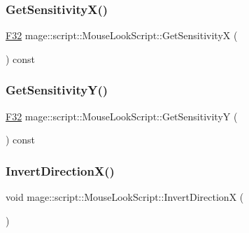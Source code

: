 \hypertarget{classmage_1_1script_1_1_mouse_look_script_a86ee9593f0221bfa259f5ae5dd6edb30}{}\label{classmage_1_1script_1_1_mouse_look_script_a86ee9593f0221bfa259f5ae5dd6edb30} 
\subsubsection{\texorpdfstring{Get\+Sensitivity\+X()}{GetSensitivityX()}}
{\footnotesize\ttfamily \hyperlink{namespacemage_aa97e833b45f06d60a0a9c4fc22ae02c0}{F32} mage\+::script\+::\+Mouse\+Look\+Script\+::\+Get\+SensitivityX (\begin{DoxyParamCaption}{ }\end{DoxyParamCaption}) const\hspace{0.3cm}{\ttfamily [noexcept]}}

\hypertarget{classmage_1_1script_1_1_mouse_look_script_a39303e2d535ecc610ac4ea2f23825452}{}\label{classmage_1_1script_1_1_mouse_look_script_a39303e2d535ecc610ac4ea2f23825452} 
\subsubsection{\texorpdfstring{Get\+Sensitivity\+Y()}{GetSensitivityY()}}
{\footnotesize\ttfamily \hyperlink{namespacemage_aa97e833b45f06d60a0a9c4fc22ae02c0}{F32} mage\+::script\+::\+Mouse\+Look\+Script\+::\+Get\+SensitivityY (\begin{DoxyParamCaption}{ }\end{DoxyParamCaption}) const\hspace{0.3cm}{\ttfamily [noexcept]}}

\hypertarget{classmage_1_1script_1_1_mouse_look_script_aa527806c78873eab652dd6337a75b89f}{}\label{classmage_1_1script_1_1_mouse_look_script_aa527806c78873eab652dd6337a75b89f} 
\subsubsection{\texorpdfstring{Invert\+Direction\+X()}{InvertDirectionX()}}
{\footnotesize\ttfamily void mage\+::script\+::\+Mouse\+Look\+Script\+::\+Invert\+DirectionX (\begin{DoxyParamCaption}{ }\end{DoxyParamCaption})\hspace{0.3cm}{\ttfamily [noexcept]}}

